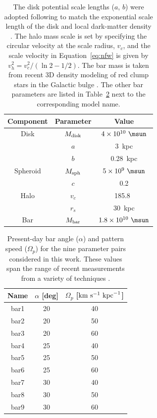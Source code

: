 \documentclass[letterpaper,12pt,preprint]{aastex}
\begin{document}
\begin{table}[ht]
\begin{center}
	\begin{tabular}{ c | c | c }
	         \toprule
	         Component & Parameter & Value \\\toprule
		Disk & $M_{\rm disk}$ & $4 \times 10^{10}~\msun$ \\
		& $a$ & 3~{\rm kpc}\\
		& $b$ & 0.28~{\rm kpc} \\\midrule
		Spheroid & $M_{\rm sph}$ & $5 \times 10^{9}~\msun$ \\
		& $c$ & 0.2 \\\midrule
	         Halo & $v_c$ & 185.8~\kms\\
		& $r_s$ & 30~kpc \\
		Bar & $M_{\rm bar}$ & $1.8 \times 10^{10}~\msun$ \\
		\bottomrule
		\end{tabular}
	\caption{The disk potential scale lengths ($a$, $b$) were adopted following \citep{bovy15-galpy} to match the exponential scale length of the disk \citep{bovyrix13} and local dark-matter density \citep[e.g.,][]{bovytremaine12}. The halo mass scale is set by specifying the circular velocity at the scale radius, $v_c$, and the scale velocity in Equation~\ref{eq:nfw} is given by $v_h^2 = v_c^2 / (\ln2 - 1/2)$. The bar mass is taken from recent 3D density modeling of red clump stars in the Galactic bulge \citep{portail15}. The other bar parameters are listed in Table~\ref{tbl:bar-specific} next to the corresponding model name. \label{tbl:potential-params-barred}}
\end{center}
\end{table}

\begin{table}[ht]
\begin{center}
	\begin{tabular}{ c | c | c }
	         \toprule
	         Name & $\alpha$ [deg] & $\Omega_p$ [${\rm km}~{\rm s}^{-1}~{\rm kpc}^{-1}$] \\\toprule
		bar1 & 20 & 40\\
		bar2 & 20 & 50\\
		bar3 & 20 & 60\\
		bar4 & 25 & 40\\
		bar5 & 25 & 50\\
		bar6 & 25 & 60\\
		bar7 & 30 & 40\\
		bar8 & 30 & 50\\
		bar9 & 30 & 60\\
		\bottomrule
		\end{tabular}
	\caption{Present-day bar angle ($\alpha$) and pattern speed ($\Omega_p$) for the nine parameter pairs considered in this work. These values span the range of recent measurements from a variety of techniques \citep{dwek95, wang12,wang13,wegg13}. \label{tbl:bar-specific}}
\end{center}
\end{table}
\end{document}
